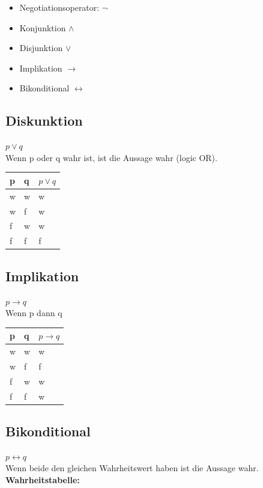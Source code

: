 \documentclass[12pt]{scrartcl}
\begin{document}
\begin{itemize}
    \item Negotiationsoperator: $\lnot$
    \item Konjunktion $\land$
    \item Disjunktion $\lor$
    \item Implikation $\rightarrow$
    \item Bikonditional $\leftrightarrow$
\end{itemize}



\subsection{Diskunktion}
$p \lor q$\\
Wenn p oder q wahr ist, ist die Aussage wahr (logic OR).


\renewcommand{\arraystretch}{1.5}
\begin{tabular}{ | m{3em} | m{3em} | m{3em} | }
    \hline
    p & q & $p \lor q$\\ 
    \hline
    w & w & w\\ 
    \hline
    w & f & w\\ 
    \hline
    f & w & w\\ 
    \hline
    f & f & f\\ 
    \hline
\end{tabular}


\subsection{Implikation}
$p \rightarrow q$\\
Wenn p dann q


\renewcommand{\arraystretch}{1.5}
\begin{tabular}{ | m{3em} | m{3em} | m{3em} | }
    \hline
    p & q & $p \rightarrow q$\\ 
    \hline
    w & w & w\\ 
    \hline
    w & f & f\\ 
    \hline
    f & w & w\\ 
    \hline
    f & f & w\\ 
    \hline
\end{tabular}


\subsection{Bikonditional}
$p \leftrightarrow q$\\
Wenn beide den gleichen Wahrheitswert haben ist die Aussage wahr.\\
\textbf{Wahrheitstabelle:}\\
\end{document}

